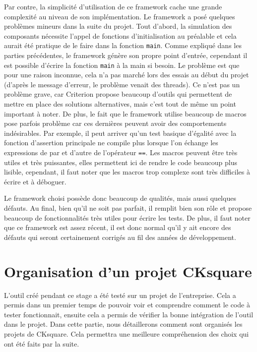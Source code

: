 \documentclass[a4paper]{article}
\begin{document}
Par contre, la simplicité d'utilisation de ce framework cache une grande
complexité au niveau de son implémentation. Le framework a posé quelques
problèmes mineurs dans la suite du projet. Tout d'abord, la simulation des
composants nécessite l'appel de fonctions d'initialisation au préalable et cela
aurait été pratique de le faire dans la fonction \verb|main|. Comme
expliqué dans les parties précédentes, le framework génère son propre point
d'entrée, cependant il est possible d'écrire la fonction \verb|main| à la
main si besoin. Le problème est que pour une raison inconnue, cela n'a pas
marché lors des essais au début du projet (d'après le message d'erreur, le
problème venait des threads). Ce n'est pas un problème grave, car Criterion
propose beaucoup d'outils qui permettent de mettre en place des solutions
alternatives, mais c'est tout de même un point important à noter. De plus, le
fait que le framework utilise beaucoup de macros pose parfois problème car ces
dernières peuvent avoir des comportements indésirables. Par exemple, il peut
arriver qu'un test basique d'égalité avec la fonction d'assertion principale ne
compile plus lorsque l'on échange les expressions de par et d'autre de
l'opérateur \verb|==|. Les macros peuvent être très utiles et très
puissantes, elles permettent ici de rendre le code beaucoup plus lisible,
cependant, il faut noter que les macros trop complexe sont très difficiles à
écrire et à déboguer.

Le framework choisi possède donc beaucoup de qualités, mais aussi quelques
défauts. Au final, bien qu'il ne soit pas parfait, il remplit bien son rôle et
propose beaucoup de fonctionnalités très utiles pour écrire les tests. De
plus, il faut noter que ce framework est assez récent, il est donc normal qu'il
y ait encore des défauts qui seront certainement corrigés au fil des années de
développement.
\section{Organisation d'un projet CKsquare}%

L'outil créé pendant ce stage a été testé sur un projet de l'entreprise. Cela a
permis dans un premier temps de pouvoir voir et comprendre comment le code à
tester fonctionnait, ensuite cela a permis de vérifier la bonne intégration de
l'outil dans le projet. Dans cette partie, nous détaillerons comment sont
organisés les projets de CKsquare. Cela permettra une meilleure compréhension des
choix qui ont été faits par la suite.
\end{document}
